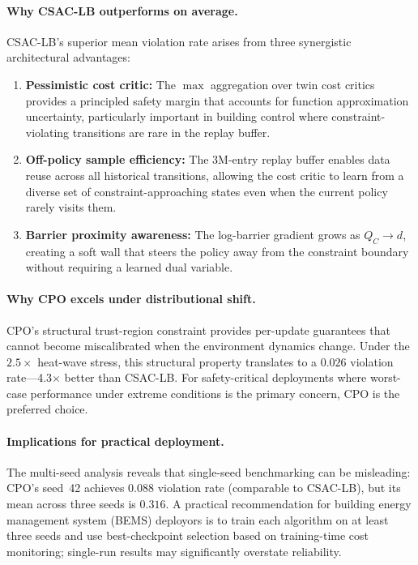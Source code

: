 \paragraph{Why CSAC-LB outperforms on average.}
CSAC-LB's superior mean violation rate arises from three synergistic
architectural advantages:
\begin{enumerate}
  \item \textbf{Pessimistic cost critic:} The $\max$ aggregation over twin
    cost critics provides a principled safety margin that accounts for
    function approximation uncertainty, particularly important in building
    control where constraint-violating transitions are rare in the replay
    buffer.
  \item \textbf{Off-policy sample efficiency:} The 3M-entry replay buffer
    enables data reuse across all historical transitions, allowing the cost
    critic to learn from a diverse set of constraint-approaching states even
    when the current policy rarely visits them.
  \item \textbf{Barrier proximity awareness:} The log-barrier gradient grows
    as $Q_C \to d$, creating a soft wall that steers the policy away from
    the constraint boundary without requiring a learned dual variable.
\end{enumerate}

\paragraph{Why CPO excels under distributional shift.}
CPO's structural trust-region constraint provides per-update guarantees that
cannot become miscalibrated when the environment dynamics change.  Under the
$2.5\times$ heat-wave stress, this structural property translates to a
$0.026$ violation rate---4.3$\times$ better than CSAC-LB.  For
safety-critical deployments where worst-case performance under extreme
conditions is the primary concern, CPO is the preferred choice.

\paragraph{Implications for practical deployment.}
The multi-seed analysis reveals that single-seed benchmarking can be misleading:
CPO's seed~42 achieves $0.088$ violation rate (comparable to CSAC-LB), but its
mean across three seeds is $0.316$.  A practical recommendation for building
energy management system (BEMS) deployors is to train each algorithm on at
least three seeds and use best-checkpoint selection based on training-time cost
monitoring; single-run results may significantly overstate reliability.


